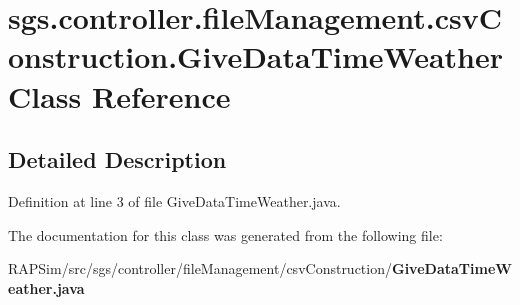 \section{sgs.\-controller.\-file\-Management.\-csv\-Construction.\-Give\-Data\-Time\-Weather Class Reference}
\label{classsgs_1_1controller_1_1file_management_1_1csv_construction_1_1_give_data_time_weather}


\subsection{Detailed Description}


Definition at line 3 of file Give\-Data\-Time\-Weather.\-java.



The documentation for this class was generated from the following file\-:\begin{DoxyCompactItemize}
\item 
R\-A\-P\-Sim/src/sgs/controller/file\-Management/csv\-Construction/{\bf Give\-Data\-Time\-Weather.\-java}\end{DoxyCompactItemize}
